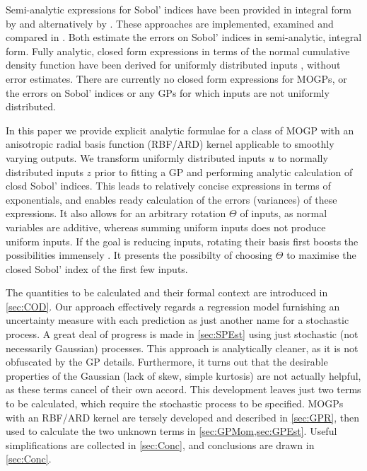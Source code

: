 \documentclass[preprint,12pt]{elsarticle}
\begin{document}
Semi-analytic expressions for Sobol' indices have been provided in integral form by \cite{Oakley.OHagan2004} and alternatively by \cite{Chen.etal2005}. These approaches are implemented, examined and compared in \cite{Marrel.etal2009,Srivastava.etal2017}. Both \cite{Oakley.OHagan2004,Marrel.etal2009} estimate the errors on Sobol' indices in semi-analytic, integral form. Fully analytic, closed form expressions in terms of the normal cumulative density function have been derived for uniformly distributed inputs \cite{Wu.etal2016a}, without error estimates. There are currently no closed form expressions for MOGPs, or the errors on Sobol' indices or any GPs for which inputs are not uniformly distributed. 

In this paper we provide explicit analytic formulae for a class of MOGP with an anisotropic radial basis function (RBF/ARD) kernel applicable to smoothly varying outputs. 
We transform uniformly distributed inputs $u$ to normally distributed inputs $z$ prior to fitting a GP and performing analytic calculation of closd Sobol' indices. This leads to relatively concise expressions in terms of exponentials, and enables ready calculation of the errors (variances) of these expressions. It also allows for an arbitrary rotation $\Theta$ of inputs, as normal variables are additive, whereas summing uniform inputs does not produce uniform inputs. If the goal is reducing inputs, rotating their basis first boosts the possibilities immensely \cite{Constantine2015}. It presents the possibilty of choosing $\Theta$ to maximise the closed Sobol' index of the first few inputs.


The quantities to be calculated and their formal context are introduced in \cref{sec:COD}. Our approach effectively regards a regression model furnishing an uncertainty measure with each prediction as just another name for a stochastic process. A great deal of progress is made in \cref{sec:SPEst} using just stochastic (not necessarily Gaussian) processes. This approach is analytically cleaner, as it is not obfuscated by the GP details. Furthermore, it turns out that the desirable properties of the Gaussian (lack of skew, simple kurtosis) are not actually helpful, as these terms cancel of their own accord. This development leaves just two terms to be calculated, which require the stochastic process to be specified. MOGPs with an RBF/ARD kernel are tersely developed and described in \cref{sec:GPR}, then used to calculate the two unknown terms in \cref{sec:GPMom,sec:GPEst}. Useful simplifications are collected in \cref{sec:Conc}, and conclusions are drawn in \cref{sec:Conc}.
\end{document}
